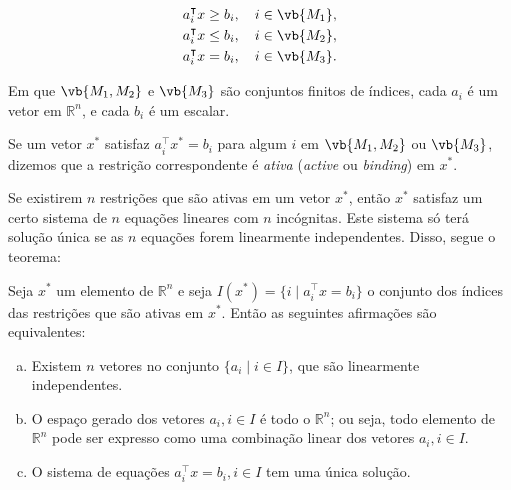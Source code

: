 \begin{equation}
\begin{aligned}
 &a_i^\intercal x\geq b_i,\quad i \in \vb{M_1},\nonumber\\
 &a_i^\intercal x\leq b_i,\quad i \in \vb{M_2},\nonumber\\
 &a_i^\intercal x = b_i,\quad i \in \vb{M_3}.\nonumber
\end{aligned}
\end{equation}

Em que $\vb{M_1, M_2}$ e $\vb{M_3}$ são conjuntos finitos de índices, cada $a_i$ é um vetor em $\mathbb{R}^n$, e cada $b_i$ é um escalar.

\begin{mydef}
 Se um vetor $x^*$ satisfaz $a^\intercal _ix^*=b_i$ para algum $i$ em $\vb{M_1, M_2}$ ou $\vb{M_3}$, dizemos que a restrição correspondente é \emph{ativa} (\emph{active} ou \emph{binding}) em $x^*$.
\end{mydef}

Se existirem $n$ restrições que são ativas em um vetor $x^*$, então $x^*$ satisfaz um certo sistema de $n$ equações lineares com $n$ incógnitas. Este sistema só terá solução única se as $n$ equações forem linearmente independentes. Disso, segue o teorema:

\begin{theorem}\label{teo:af_eq}
Seja $x^*$ um elemento de $\mathbb{R}^n$ e seja $I(x^*) = \{i \mid a_i^\intercal x = b_i\}$ o conjunto dos índices das restrições que são ativas em $x^*$. Então as seguintes afirmações são equivalentes:
\begin{enumerate}[(a)]
\item\label{item:ativa_a} Existem $n$ vetores no conjunto $\{a_i\mid i\in I\}$, que são linearmente independentes.
\item\label{item:ativa_b} O espaço gerado dos vetores $a_i, i\in I$ é todo o $\mathbb{R}^n$; ou seja, todo elemento de $\mathbb{R}^n$ pode ser expresso como uma combinação linear dos vetores $a_i, i\in I$.
\item\label{item:ativa_c} O sistema de equações $a^\intercal _ix = b_i, i \in I$ tem uma única solução.
\end{enumerate}
\end{theorem}

